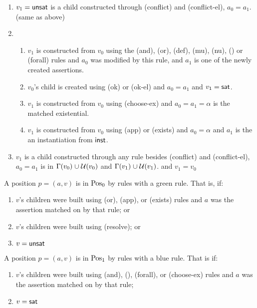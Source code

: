 \begin{enumerate}
\def\labelenumi{\alph{enumi})}
\item
  \(v_1 = \mathsf{unsat}\) is a child constructed through (conflict)
  and (conflict-el), \(a_0 = a_1\). (same as above)
\item
  \begin{enumerate}
  \def\labelenumii{\arabic{enumii}.}
  \tightlist
  \item
    \(v_1\) is constructed from \(v_0\)
    using the (and), (or), (def), (mu), (nu), (\dapp) or (forall) rules
    and \(a_0\) was modified by this rule,
    and \(a_1\) is one of the newly created assertions.
  \item
    \(v_0\)'s child is created using (ok) or (ok-el)
    and \(a_0 = a_1\) and \(v_1 = \mathsf{sat}\).
  \item
    \(v_1\) is constructed from \(v_0\)
    using (choose-ex)
    and \(a_0 = a_1 = \alpha\) is the matched existential.
  \item
    \(v_1\) is constructed from \(v_0\)
    using (app) or (exists)
    and \(a_0 = \alpha\) and \(a_1\) is the an instantiation from \(\mathsf{inst}\).
  \end{enumerate}
\item
  \(v_1\) is a child constructed through any rule besides (conflict)
  and (conflict-el),
  \(a_0 = a_1\) is in \(\Gamma(v_0) \mathrel{\cup} \mathcal{U}(v_0)\)
  and \(\Gamma(v_1) \mathrel{\cup} \mathcal{U}(v_1)\).
  and \(v_1 = v_0\)
\end{enumerate}

\newcommand{\green}[1]{{\color{green}#1}}
\newcommand{\blue}[1]{{\color{blue}#1}}

A position \(p = (a, v)\) is in \(\mathrm{Pos}_0\) by rules with a {\color{green}green} rule. That is, if:

\begin{enumerate}
\def\labelenumi{\arabic{enumi}.}
\tightlist
\item
  \(v\)'s children were built using (or), (app), or (exists) rules
  and \(a\) was the assertion matched on by that rule; or
\item
  \(v\)'s children were built using (resolve); or
\item
  \(v = \mathsf{unsat}\)
\end{enumerate}

A position \(p = (a, v)\) is in \(\mathrm{Pos}_1\) by rules with a {\color{blue}blue} rule. That is if:

\begin{enumerate}
\def\labelenumi{\arabic{enumi}.}
\tightlist
\item
  \(v\)'s children were built using (and), (\dapp), (forall), or (choose-ex) rules
  and \(a\) was the assertion matched on by that rule;
\item
  \(v = \mathsf{sat}\)
\end{enumerate}


